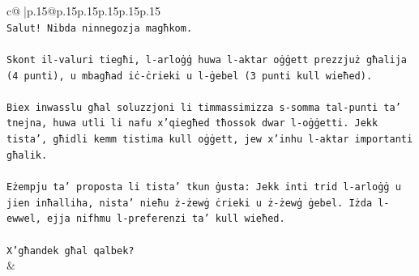 \documentclass{article}
\begin{document}
{\begin{supertabular}{c@{$\;$}|p{.15\linewidth}@{}p{.15\linewidth}p{.15\linewidth}p{.15\linewidth}p{.15\linewidth}p{.15\linewidth}}
{{{\\ 
\texttt{Salut! Nibda ninnegozja magħkom.} \\
\\ 
\texttt{Skont il{-}valuri tiegħi, l{-}arloġġ huwa l{-}aktar oġġett prezzjuż għalija (4 punti), u mbagħad iċ{-}ċrieki u l{-}ġebel (3 punti kull wieħed).} \\
\\ 
\texttt{Biex inwasslu għal soluzzjoni li timmassimizza s{-}somma tal{-}punti ta' tnejna, huwa utli li nafu x'qiegħed tħossok dwar l{-}oġġetti. Jekk tista', għidli kemm tistima kull oġġett, jew x'inhu l{-}aktar importanti għalik.} \\
\\ 
\texttt{Eżempju ta' proposta li tista' tkun ġusta: Jekk inti trid l{-}arloġġ u jien inħalliha, nista' nieħu ż{-}żewġ ċrieki u ż{-}żewġ ġebel. Iżda l{-}ewwel, ejja nifhmu l{-}preferenzi ta' kull wieħed.} \\
\\ 
\texttt{X'għandek għal qalbek?} \\
            }
        }
    }
    & \\ \\


\end{supertabular}}
\end{document}
